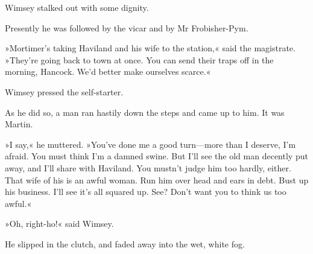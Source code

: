 Wimsey stalked out with some dignity.

Presently he was followed by the vicar and by Mr Frobisher-Pym.

»Mortimer's taking Haviland and his wife to the station,« said the magistrate. »They're going back to town at once. You can send their traps off in the morning, Hancock. We'd better make ourselves scarce.«

Wimsey pressed the self-starter.

As he did so, a man ran hastily down the steps and came up to him. It was Martin.

»I say,« he muttered. »You've done me a good turn—more than I deserve, I'm afraid. You must think I'm a damned swine. But I'll see the old man decently put away, and I'll share with Haviland. You mustn't judge him too hardly, either. That wife of his is an awful woman. Run him over head and ears in debt. Bust up his business. I'll see it's all squared up. See? Don't want you to think us too awful.«

»Oh, right-ho!« said Wimsey.

He slipped in the clutch, and faded away into the wet, white fog.